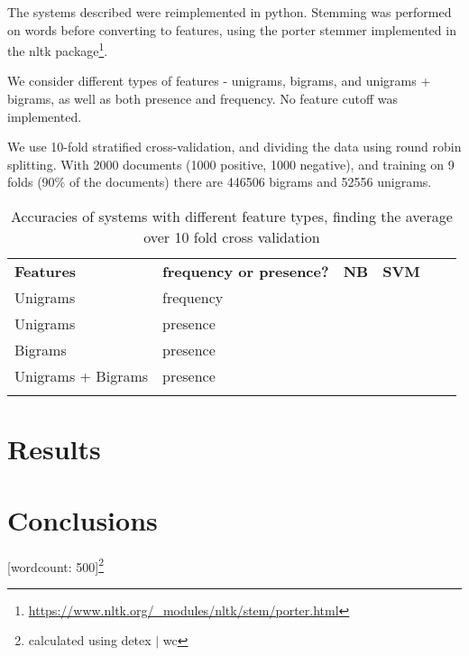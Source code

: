 \documentclass[12pt,a4paper]{article}
\begin{document}
\begin{multicols}{2}
The systems described were reimplemented in python. Stemming was performed on words before converting to features, using the porter stemmer implemented in the nltk package\footnote{\url{https://www.nltk.org/_modules/nltk/stem/porter.html}}. 

We consider different types of features - unigrams, bigrams, and unigrams + bigrams, as well as both presence and frequency. No feature cutoff was implemented.


We use 10-fold stratified cross-validation, and dividing the data using round robin splitting. With 2000 documents (1000 positive, 1000 negative), and training on 9 folds (90\% of the documents) there are 446506 bigrams and 52556 unigrams.
\end{multicols}

\begin{table*}
  \centering
  \begin{tabular}{llllll}
  \cline{1-4}
  \multicolumn{1}{|l|}{\textbf{Features}}  & \multicolumn{1}{l|}{\textbf{frequency or presence?}} & \multicolumn{1}{l|}{\textbf{NB}} & \multicolumn{1}{l|}{\textbf{SVM}} &  &  \\ \cline{1-4}
  \multicolumn{1}{|l|}{Unigrams}           & \multicolumn{1}{l|}{frequency}                       & \multicolumn{1}{l|}{}            & \multicolumn{1}{l|}{}             &  &  \\ \cline{1-4}
  \multicolumn{1}{|l|}{Unigrams}           & \multicolumn{1}{l|}{presence}                        & \multicolumn{1}{l|}{}            & \multicolumn{1}{l|}{}             &  &  \\ \cline{1-4}
  \multicolumn{1}{|l|}{Bigrams}            & \multicolumn{1}{l|}{presence}                        & \multicolumn{1}{l|}{}            & \multicolumn{1}{l|}{}             &  &  \\ \cline{1-4}
  \multicolumn{1}{|l|}{Unigrams + Bigrams} & \multicolumn{1}{l|}{presence}                        & \multicolumn{1}{l|}{}            & \multicolumn{1}{l|}{}             &  &  \\ \cline{1-4}
                                           &                                                      &                                  &                                   &  & 
  \end{tabular}
  \caption{Accuracies of systems with different feature types, finding the average over 10 fold cross validation}
  \label{tab:my-table}
  \end{table*}

\begin{multicols}{2}
\section{Results}
\blindtext



\section{Conclusions}

\centerline{[wordcount: 500]\footnote{calculated using detex $|$ wc}}

\end{multicols}

\clearpage


\end{document}
